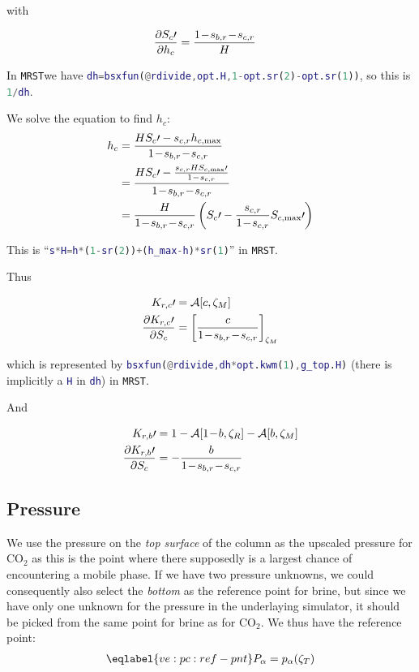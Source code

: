 \documentclass[12pt]{scrartcl}
\newcommand{\mth}[1]{\ensuremath{#1}\xspace}
\newcommand{\COO}{\mth{\mathrm{CO}_2}}
\newcommand{\MRST}{{\tt MRST}}
\newcommand{\aleft}{\mathopen{}\mathclose\bgroup\left}  %
\newcommand{\aright}{\aftergroup\egroup\right}          %
\newcommand{\binop}[3]{#1\mkern1mu{#2}\mkern1mu #3}     %
\newcommand{\dual}[1]{\binop{1}{-}{#1}}                 %
\newcommand{\ddual}[2]{\binop{\binop{1}{-}{#1}}{-}{#2}} %
\newcommand{\at}[2]{\left[ #1 \right]_{#2}}             %
\newcommand{\der}[2]{\frac{\partial{#1}}{\partial{#2}}}       %
\newcommand{\Hei}{H}        %
\newcommand{\hei}{h}        %
\newcommand{\Sat}{S}        %
\newcommand{\sat}{s}        %
\newcommand{\sr}[1]{\sat_{#1,r}}    %
\newcommand{\Rlp}[1]{K_{r,#1}}  %
\newcommand{\phs}{\alpha}   %
\newcommand{\Lev}{\zeta}    %
\newcommand{\Top}{T}        %
\newcommand{\Res}{R}        %
\newcommand{\Mob}{M}        %
\newcommand{\nap}{c}        %
\newcommand{\wet}{b}        %
\newcommand{\avg}[2]{\mathcal{A}\aleft[#1, #2\aright]}  %
\newcommand{\krnwr}{c}      %
\newcommand{\krwnr}{b}      %
\newcommand{\pres}{p}       %
\newcommand{\Pres}{P}       %
\newcommand{\Satn}{\Sat_\nap}
\newcommand{\Satnmax}{\Sat_{\nap,\max}} %
\newcommand{\snr}{\sr{\nap}}    %
\newcommand{\swr}{\sr{\wet}}    %
\newcommand{\LevT}{\Lev_\Top}
\newcommand{\LevM}{\Lev_\Mob}
\newcommand{\LevR}{\Lev_\Res}
\newcommand{\hnap}{\hei_\nap}           %
\newcommand{\hnmax}{\hei_{\nap,\max}}   %
\newcommand{\Rlpn}{\Rlp{\nap}}  %
\newcommand{\Rlpw}{\Rlp{\wet}}  %
\begin{document}
with

\begin{align}
\der{ \Satn \prime }{ \hnap } &= \frac{ \ddual{ \swr }{ \snr } }{ \Hei }
\end{align}

In \MRST we have \lstinline[language=Matlab]!dh=bsxfun(@rdivide,opt.H,1-opt.sr(2)-opt.sr(1))!, so this is \lstinline[language=Matlab]!1/dh!.

We solve the equation to find \( \hnap \):
\begin{align}
\hnap &= \frac{ \Hei \Satn \prime - \snr \hnmax }{ \ddual{ \swr }{ \snr } } \\
&= \frac{ \Hei \Satn \prime - \frac{ \snr \Hei \Satnmax \prime }{ \dual{ \snr } } }{ \ddual{ \swr }{ \snr } } \\
&= \frac{ \Hei }{ \ddual{ \swr }{ \snr } } \left( \Satn \prime - \frac{ \snr }{ \dual{ \snr } } \Satnmax \prime \right)
\end{align}

This is ``\lstinline[language=Matlab]!s*H=h*(1-sr(2))+(h_max-h)*sr(1)!'' in \MRST.

Thus

\begin{align}
\Rlpn \prime &= \avg{ \krnwr }{ \LevM } \\
\der{ \Rlpn \prime }{ \Satn } &= \at{ \frac{ \krnwr }{ \ddual{ \swr }{ \snr } } }{ \LevM }
\end{align}

which is represented by \lstinline[language=Matlab]!bsxfun(@rdivide,dh*opt.kwm(1),g_top.H)! (there is implicitly a \lstinline[language=Matlab]!H! in \lstinline[language=Matlab]!dh!) in \MRST.

And

\begin{align}
\Rlpw \prime &= 1 - \avg{ \dual{ \krwnr } }{ \LevR } - \avg{ \krwnr }{ \LevM } \\
\der{ \Rlpw \prime }{ \Satn } &= - \frac{ \krwnr }{ \ddual{ \swr }{ \snr } }
\end{align}

\subsection{Pressure}
We use the pressure on the \emph{top surface} of the column as the upscaled pressure for \COO as this is the point where there supposedly is a largest chance of encountering a mobile phase. If we have two pressure unknowns, we could consequently also select the \emph{bottom} as the reference point for brine, but since we have only one unknown for the pressure in the underlaying simulator, it should be picked from the same point for brine as for \COO. We thus have the reference point:
\begin{align}
\eqlabel{ve:pc:ref-pnt}
\Pres_\phs = \pres_\phs \aleft( \LevT \aright)
\end{align}
\end{document}
